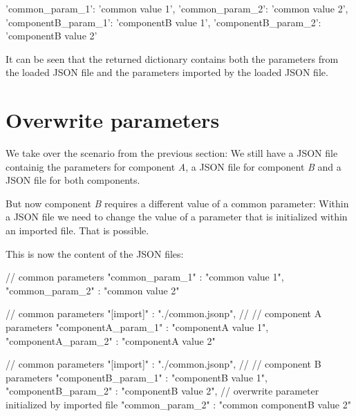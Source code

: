\begin{pythonlog}
{'common_param_1': 'common value 1',
 'common_param_2': 'common value 2',
 'componentB_param_1': 'componentB value 1',
 'componentB_param_2': 'componentB value 2'}
\end{pythonlog}

It can be seen that the returned dictionary contains both the parameters from the loaded JSON file and the parameters imported by the loaded JSON file.


\section{Overwrite parameters}

We take over the scenario from the previous section: We still have a JSON file  containig the parameters for
component \textit{A}, a JSON file  for component \textit{B} and a JSON file  for both components.

But now component \textit{B} requires a different value of a common parameter: Within a JSON file we need to change the value of a parameter
that is initialized within an imported file. That is possible.

\vspace{2ex}

This is now the content of the JSON files:

\vspace{2ex}

\textbullet {}

\begin{pythoncode}
{
   // common parameters
   "common_param_1" : "common value 1",
   "common_param_2" : "common value 2"
}
\end{pythoncode}

\textbullet {}

\begin{pythoncode}
{
   // common parameters
   "[import]" : "./common.jsonp",
   //
   // component A parameters
   "componentA_param_1" : "componentA value 1",
   "componentA_param_2" : "componentA value 2"
}
\end{pythoncode}

\textbullet {}

\begin{pythoncode}[linebackgroundcolor=\hlcode{8,9}]
{
   // common parameters
   "[import]" : "./common.jsonp",
   //
   // component B parameters
   "componentB_param_1" : "componentB value 1",
   "componentB_param_2" : "componentB value 2",
   // overwrite parameter initialized by imported file
   "common_param_2" : "common componentB value 2"
}
\end{pythoncode}

